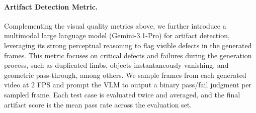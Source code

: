 \paragraph{\bf{Artifact Detection Metric.}}

Complementing the visual quality metrics above, we further introduce a multimodal large language model (Gemini-3.1-Pro) for artifact detection, leveraging its strong perceptual reasoning to flag visible defects in the generated frames. This metric focuses on critical defects and failures during the generation process, such as duplicated limbs, objects instantaneously vanishing, and geometric pass-through, among others. We sample frames from each generated video at 2 FPS and prompt the VLM to output a binary pass/fail judgment per sampled frame. Each test case is evaluated twice and averaged, and the final artifact score is the mean pass rate across the evaluation set.

